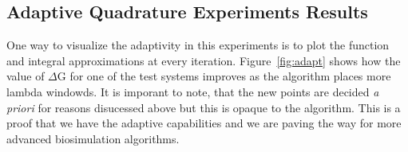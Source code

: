 
\subsection{Adaptive Quadrature Experiments Results}

One way to visualize the adaptivity in this experiments is to plot the function
and integral approximations at every iteration. Figure~\ref{fig:adapt} shows
how the value of $\Delta$G for one of the test systems improves as the
algorithm places more lambda windowds. It is imporant to note, that the new
points are decided {\it a priori} for reasons disucessed above but this is
opaque to the algorithm. This is a proof that we have the adaptive capabilities
and we are paving the way for more advanced biosimulation algorithms.

